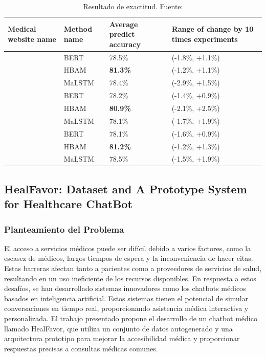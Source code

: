 		\begin{table}[h]
			\centering
			\begin{tabular}{|>{\raggedright}p{4cm}|>{\raggedright}p{2.5cm}|>{\raggedright}p{3.5cm}|>{\raggedright\arraybackslash}p{4.5cm}|}
				\hline
				\textbf{Medical website name} & \textbf{Method name} & \textbf{Average predict accuracy} & \textbf{Range of change by 10 times experiments} \\
				\hline
				\multirow{3}{*}{ehealthforumQAs} 
				& BERT & 78.5\% & (-1.8\%, +1.1\%) \\
				& HBAM & \textbf{81.3\%} & (-1.2\%, +1.1\%) \\
				& MaLSTM & 78.4\% & (-2.9\%, +1.5\%) \\
				\hline
				\multirow{3}{*}{questionDoctorQAs} 
				& BERT & 78.2\% & (-1.4\%, +0.9\%) \\
				& HBAM & \textbf{80.9\%} & (-2.1\%, +2.5\%) \\
				& MaLSTM & 78.1\% & (-1.7\%, +1.9\%) \\
				\hline
				\multirow{3}{*}{webmdQAs} 
				& BERT & 78.1\% & (-1.6\%, +0.9\%) \\
				& HBAM & \textbf{81.2\%} & (-1.2\%, +1.3\%) \\
				& MaLSTM & 78.5\% & (-1.5\%, +1.9\%) \\
				\hline
			\end{tabular}
			\caption{Resultado de exactitud. Fuente: \cite{HHHAnOnlineMedical}}
		\end{table}


\subsection{HealFavor: Dataset and A Prototype System for Healthcare ChatBot \citep*{HealFavor}} %
	\subsubsection{Planteamiento del Problema}
		El acceso a servicios médicos puede ser difícil debido a varios factores, como la escasez de médicos, largos tiempos de espera y la inconveniencia de hacer citas. Estas barreras afectan tanto a pacientes como a proveedores de servicios de salud, resultando en un uso ineficiente de los recursos disponibles. En respuesta a estos desafíos, se han desarrollado sistemas innovadores como los chatbots médicos basados en inteligencia artificial. Estos sistemas tienen el potencial de simular conversaciones en tiempo real, proporcionando asistencia médica interactiva y personalizada. El trabajo presentado propone el desarrollo de un chatbot médico llamado HealFavor, que utiliza un conjunto de datos autogenerado y una arquitectura prototipo para mejorar la accesibilidad médica y proporcionar respuestas precisas a consultas médicas comunes.

